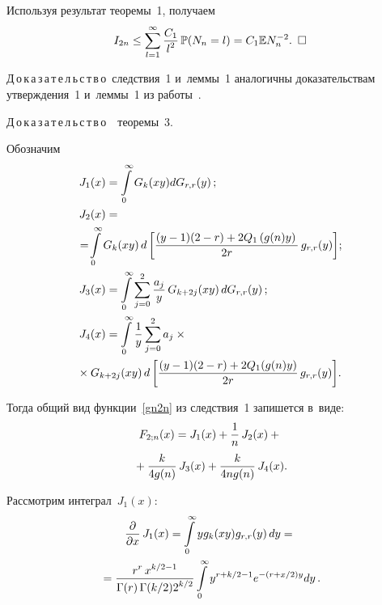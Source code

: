 \begin{multicols}{2}
Используя результат теоремы~1, получаем
\begin{equation*}
I_{2n} \leq  \sum\limits_{l=1}^{\infty} \displaystyle\frac{\displaystyle C_1\mathstrut}{\displaystyle l^2\mathstrut}\,\mathbb{P}(N_n=l) = 
C_1\mathbb{E}N_n^{-2}. \enskip \square
\end{equation*}

\noindent
Д\,о\,к\,а\,з\,а\,т\,е\,л\,ь\,с\,т\,в\,о\ следствия~1 и~леммы~1 аналогичны доказательствам 
утверждения~1 и~леммы~1 из работы~\cite{CMU}.

 
\noindent
Д\,о\,к\,а\,з\,а\,т\,е\,л\,ь\,с\,т\,в\,о\ \ теоремы~3.

Обозначим
\begin{align*}
 J_1(x) &= \int\limits^{\infty}_{0} G_k(xy)dG_{r,r}(y)\,;\\
 J_2(x) &= {}\\
 &\hspace*{-9mm}{}= \!
\int\limits^{\infty}_{0} G_k(xy) \,d\left[  \fr{(y - 1)(2 - r) + 2 
Q_1\left(g(n)y\right)}{2 r}\,g_{r,r}(y) \right]\!;\hspace*{-0.60292pt}
 \\
 J_{3}(x) &=\int\limits_{0}^\infty \sum\limits_{j=0}^{2} \fr{a_j}{y}\, 
G_{k+2j}(xy)\,dG_{r,r}(y)\,;\\
 J_{4}(x) &= \int\limits_{0}^\infty \fr{1}{y} \sum\limits_{j=0}^{2}
 a_j \times{}\\
 &\hspace*{-9mm}{}\times G_{k+2j}(xy)\,d\left[  
\fr{(y - 1)(2 - r) + 2 Q_1(g(n)y)}{2 r}\,g_{r,r}(y) \right]\!.
 \end{align*}

Тогда общий вид функции~\eqref{gn2n} из следствия~1 запишется в~виде:
\begin{multline*}
F_{2;n}(x) = J_1(x) + \displaystyle\frac{\displaystyle 1\mathstrut}{\displaystyle n\mathstrut}\,J_2(x) +{}\\
{}+ \displaystyle\frac{\displaystyle k\mathstrut}{\displaystyle 4g(n)\mathstrut} \,J_3(x) 
+ \displaystyle\frac{\displaystyle k\mathstrut}{\displaystyle 4ng(n)\mathstrut}\,J_4(x).
\end{multline*}

Рассмотрим интеграл~$J_1(x)$:
\begin{multline*}
\displaystyle\frac{\displaystyle \partial\mathstrut}{\displaystyle \partial x\mathstrut}\, J_1(x) =  \int\limits^{\infty}_{0} y  g_k(xy)  
g_{r,r}(y)\,dy = {}\\
{}=
\displaystyle\frac{\displaystyle r^r\,x^{k/2-1}\mathstrut}{\displaystyle \Gamma(r)\,\Gamma(k/2)2^{k/2}\mathstrut}
\int\limits^{\infty}_{0} y^{r+k/2-1}e^{-(r+x/2)y}dy\,.
\end{multline*}



\end{multicols}
